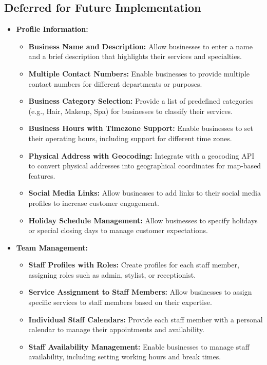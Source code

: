 \subsection{Deferred for Future Implementation}
\begin{itemize}[leftmargin=*]
    \item \textbf{Profile Information:}
    \begin{itemize}
        \item \textbf{Business Name and Description:} Allow businesses to enter a name and a brief description that highlights their services and specialties.
        \item \textbf{Multiple Contact Numbers:} Enable businesses to provide multiple contact numbers for different departments or purposes.
        \item \textbf{Business Category Selection:} Provide a list of predefined categories (e.g., Hair, Makeup, Spa) for businesses to classify their services.
        \item \textbf{Business Hours with Timezone Support:} Enable businesses to set their operating hours, including support for different time zones.
        \item \textbf{Physical Address with Geocoding:} Integrate with a geocoding API to convert physical addresses into geographical coordinates for map-based features.
        \item \textbf{Social Media Links:} Allow businesses to add links to their social media profiles to increase customer engagement.
        \item \textbf{Holiday Schedule Management:} Allow businesses to specify holidays or special closing days to manage customer expectations.
    \end{itemize}

    \item \textbf{Team Management:}
    \begin{itemize}
        \item \textbf{Staff Profiles with Roles:} Create profiles for each staff member, assigning roles such as admin, stylist, or receptionist.
        \item \textbf{Service Assignment to Staff Members:} Allow businesses to assign specific services to staff members based on their expertise.
        \item \textbf{Individual Staff Calendars:} Provide each staff member with a personal calendar to manage their appointments and availability.
        \item \textbf{Staff Availability Management:} Enable businesses to manage staff availability, including setting working hours and break times.
    \end{itemize}


\end{itemize}
